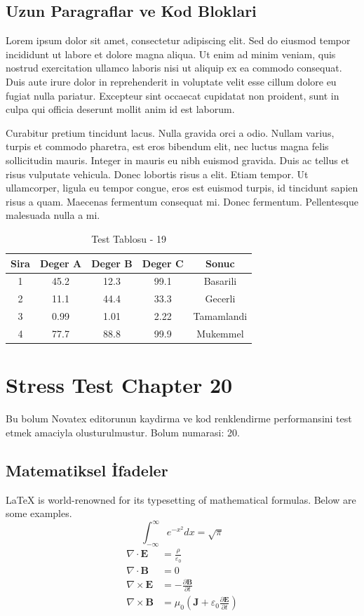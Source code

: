 \documentclass[12pt,a4paper]{article}
\begin{document}
\subsection{Uzun Paragraflar ve Kod Bloklari}
Lorem ipsum dolor sit amet, consectetur adipiscing elit. Sed do eiusmod tempor incididunt ut labore et dolore magna aliqua. Ut enim ad minim veniam, quis nostrud exercitation ullamco laboris nisi ut aliquip ex ea commodo consequat. Duis aute irure dolor in reprehenderit in voluptate velit esse cillum dolore eu fugiat nulla pariatur. Excepteur sint occaecat cupidatat non proident, sunt in culpa qui officia deserunt mollit anim id est laborum.

Curabitur pretium tincidunt lacus. Nulla gravida orci a odio. Nullam varius, turpis et commodo pharetra, est eros bibendum elit, nec luctus magna felis sollicitudin mauris. Integer in mauris eu nibh euismod gravida. Duis ac tellus et risus vulputate vehicula. Donec lobortis risus a elit. Etiam tempor. Ut ullamcorper, ligula eu tempor congue, eros est euismod turpis, id tincidunt sapien risus a quam. Maecenas fermentum consequat mi. Donec fermentum. Pellentesque malesuada nulla a mi.

\begin{table}[h!]
\centering
\begin{tabular}{|c|c|c|c|c|}
\hline
\textbf{Sira} & \textbf{Deger A} & \textbf{Deger B} & \textbf{Deger C} & \textbf{Sonuc} \\
\hline
1 & 45.2 & 12.3 & 99.1 & Basarili \\
2 & 11.1 & 44.4 & 33.3 & Gecerli \\
3 & 0.99 & 1.01 & 2.22 & Tamamlandi \\
4 & 77.7 & 88.8 & 99.9 & Mukemmel \\
\hline
\end{tabular}
\caption{Test Tablosu - 19}
\end{table}

\newpage
\section{Stress Test Chapter 20}
Bu bolum Novatex editorunun kaydirma ve kod renklendirme performansini test etmek amaciyla olusturulmustur. Bolum numarasi: 20.

\subsection{Matematiksel İfadeler}
\LaTeX{} is world-renowned for its typesetting of mathematical formulas. Below are some examples.
\begin{equation}
\int_{-\infty}^{\infty} e^{-x^2} dx = \sqrt{\pi}
\end{equation}
\begin{align}
\nabla \cdot \mathbf{E} &= \frac{\rho}{\varepsilon_0} \\
\nabla \cdot \mathbf{B} &= 0 \\
\nabla \times \mathbf{E} &= -\frac{\partial \mathbf{B}}{\partial t} \\
\nabla \times \mathbf{B} &= \mu_0\left(\mathbf{J} + \varepsilon_0 \frac{\partial \mathbf{E}}{\partial t}\right)
\end{align}
\end{document}
